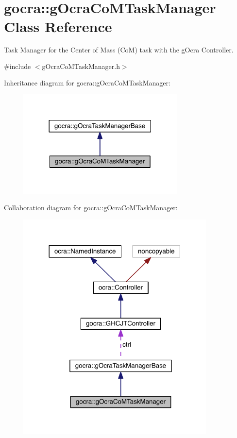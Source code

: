 \hypertarget{classgocra_1_1gOcraCoMTaskManager}{}\section{gocra\+:\+:g\+Ocra\+Co\+M\+Task\+Manager Class Reference}
\label{classgocra_1_1gOcraCoMTaskManager}


Task Manager for the Center of Mass (CoM) task with the g\+Ocra Controller.  




{\ttfamily \#include $<$g\+Ocra\+Co\+M\+Task\+Manager.\+h$>$}



Inheritance diagram for gocra\+:\+:g\+Ocra\+Co\+M\+Task\+Manager\+:\nopagebreak
\begin{figure}[H]
\begin{center}
\leavevmode
\includegraphics[width=237pt]{df/d4a/classgocra_1_1gOcraCoMTaskManager__inherit__graph}
\end{center}
\end{figure}


Collaboration diagram for gocra\+:\+:g\+Ocra\+Co\+M\+Task\+Manager\+:\nopagebreak
\begin{figure}[H]
\begin{center}
\leavevmode
\includegraphics[width=282pt]{da/db3/classgocra_1_1gOcraCoMTaskManager__coll__graph}
\end{center}
\end{figure}
